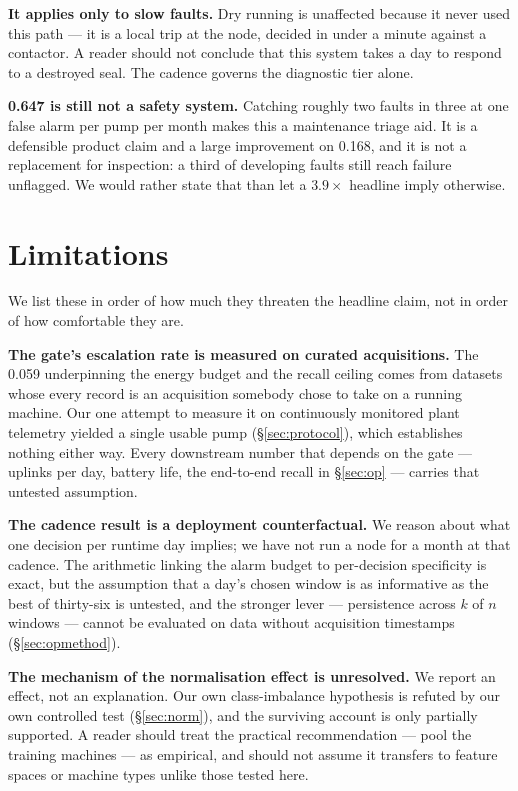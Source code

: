 \documentclass[conference,a4paper,10pt]{IEEEtran}
\begin{document}
\textbf{It applies only to slow faults.} Dry running is unaffected because it never
used this path --- it is a local trip at the node, decided in under a minute
against a contactor. A reader should not conclude that this system takes a day to
respond to a destroyed seal. The cadence governs the diagnostic tier alone.

\textbf{0.647 is still not a safety system.} Catching roughly two faults in three
at one false alarm per pump per month makes this a maintenance triage aid. It is a
defensible product claim and a large improvement on 0.168, and it is not a
replacement for inspection: a third of developing faults still reach failure
unflagged. We would rather state that than let a $3.9\times$ headline imply
otherwise.

\section{Limitations}
We list these in order of how much they threaten the headline claim, not in order
of how comfortable they are.

\textbf{The gate's escalation rate is measured on curated acquisitions.} The 0.059
underpinning the energy budget and the recall ceiling comes from datasets whose
every record is an acquisition somebody chose to take on a running machine. Our one
attempt to measure it on continuously monitored plant telemetry yielded a single
usable pump (\S\ref{sec:protocol}), which establishes nothing either way. Every
downstream number that depends on the gate --- uplinks per day, battery life, the
end-to-end recall in \S\ref{sec:op} --- carries that untested assumption.

\textbf{The cadence result is a deployment counterfactual.} We reason about what
one decision per runtime day implies; we have not run a node for a month at that
cadence. The arithmetic linking the alarm budget to per-decision specificity is
exact, but the assumption that a day's chosen window is as informative as the best
of thirty-six is untested, and the stronger lever --- persistence across $k$ of $n$
windows --- cannot be evaluated on data without acquisition timestamps
(\S\ref{sec:opmethod}).

\textbf{The mechanism of the normalisation effect is unresolved.} We report an effect, not an explanation.
Our own class-imbalance hypothesis is refuted by our own controlled test
(\S\ref{sec:norm}), and the surviving account is only partially supported. A
reader should treat the practical recommendation --- pool the training machines
--- as empirical, and should not assume it transfers to feature spaces or machine
types unlike those tested here.
\end{document}
